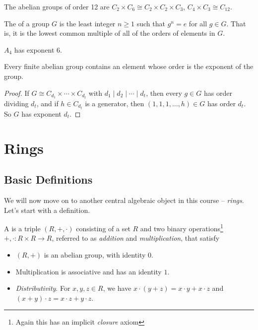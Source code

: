 \begin{example}
	The abelian groups of order 12 are $C_{2} \times C_6 \cong C_2 \times C_2 \times C_3$, $C_4 \times C_3 \cong C_{12}$.
\end{example}

\begin{definition}[Exponent]
	The  of a group $G$ is the least integer $n \geq 1$ such that $g^n = e$ for all $g \in G$. That is, it is the lowest common multiple of all of the orders of elements in $G$.
\end{definition}

\begin{example}
	$A_4$ has exponent 6.
\end{example}

\begin{corollary}
	Every finite abelian group contains an element whose order is the exponent of the group.
\end{corollary}
\begin{proof}
	If $G \cong C_{d_1} \times \cdots \times C_{d_t}$ with $d_1 \mid d_2 \mid \cdots \mid d_t$, then every $g \in G$ has order dividing $d_t$, and if $h \in C_{d_t}$ is a generator, then $(1, 1, 1, \dots, h) \in G$ has order $d_t$. So $G$ has exponent $d_t$.
\end{proof}


\section{Rings} 

\subsection{Basic Definitions}



We will now move on to another central algebraic object in this course -- \emph{rings}.
Let's start with a definition.


\begin{definition}[Ring]
	A  is a triple $(R, +, \cdot)$ consisting of a set $R$ and two binary operations\footnote{Again this has an implicit \emph{closure} axiom} $+, \cdot: R \times R \rightarrow R$, referred to as \emph{addition} and \emph{multiplication}, that satisfy
	\begin{itemize}
		\item $(R, +)$ is an abelian group, with identity $0$.
		\item Multiplication is associative and has an identity $1$.
		\item \emph{Distributivity}. For $x, y, z \in R$, we have $x \cdot (y + z) = x \cdot y + x \cdot z$ and $(x + y)\cdot z = x \cdot z + y \cdot z$.
	\end{itemize}
\end{definition}

